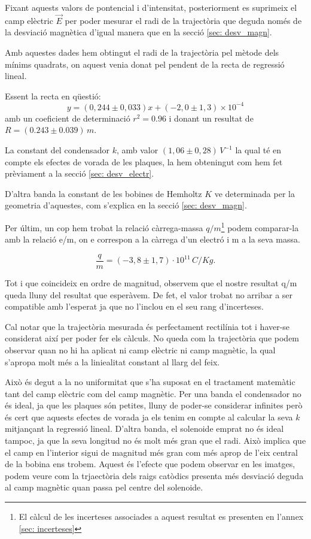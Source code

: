\documentclass[11pt]{article}
\numberwithin{equation}{section}
\numberwithin{figure}{section}
\numberwithin{table}{section}
\begin{document}
Fixant aquests valors de pontencial i d'intensitat, posteriorment es suprimeix el camp elèctric $\vec{E}$ per poder mesurar el radi de la trajectòria que deguda només de la desviació magnètica d'igual manera que en la secció \ref{sec: desv_magn}.

Amb aquestes dades hem obtingut el radi de la trajectòria pel mètode dels mínims quadrats, on aquest venia donat pel pendent de la recta de regressió lineal.

Essent la recta en qüestió: 
\begin{equation}
    y=(0,244 \pm 0,033)x + (-2,0 \pm 1,3) \times10^{-4}
\end{equation}  
amb un coeficient de determinació $r^2=0.96$ i  donant un resultat de $R = (0.243 \pm 0.039) \, m$.

La constant del condensador $k$, amb valor $(1,06 \pm 0,28)\, V^{-1}$ la qual té en compte els efectes de vorada de les plaques, la hem obteningut com hem fet prèviament a la secció \ref{sec: desv_electr}. 

D'altra banda la constant de les bobines de Hemholtz $K$ ve determinada per la geometria d'aquestes, com s'explica en la secció \ref{sec: desv_magn}.

Per últim, un cop hem trobat la relació càrrega-massa $q/m$\footnote{El càlcul de les incerteses associades a aquest resultat es presenten en l'annex \ref{sec: incerteses}} podem comparar-la amb la relació e/m, on e correspon a la càrrega d'un electró i m a la seva massa.

\[
\boxed{\frac{q}{m}=(-3,8 \pm 1,7)\cdot 10^{11}\, C/Kg.}
\] 

Tot i que coincideix en ordre de magnitud, observem que el nostre resultat q/m queda lluny del resultat que esperàvem. De fet, el valor trobat no arribar a ser compatible amb l'esperat ja que no l'inclou en el seu rang d'incerteses. 

Cal notar que la trajectòria mesurada és perfectament rectilínia tot i haver-se considerat així per poder fer els càlculs. No queda com la trajectòria que podem observar quan no hi ha aplicat ni camp elèctric ni camp magnètic, la qual s'apropa molt més a la liniealitat constant al llarg del feix. 

Això és degut a la no uniformitat que s'ha suposat en el tractament matemàtic tant del camp elèctric com del camp magnètic. Per una banda el condensador no és ideal, ja que les plaques són petites, lluny de poder-se considerar infinites però és cert que aquests efectes de vorada ja els tenim en compte al calcular la seva $k$ mitjançant la regressió lineal. D'altra banda, el solenoide emprat no és ideal tampoc, ja que la seva longitud no és molt més gran que el radi. Això implica que el camp en l'interior sigui de magnitud més gran com més aprop de l'eix central de la bobina ens trobem. Aquest és l'efecte que podem observar en les imatges, podem veure com la trjaectòria dels raigs catòdics presenta més desviació deguda al camp magnètic quan passa pel centre del solenoide.
\end{document}
